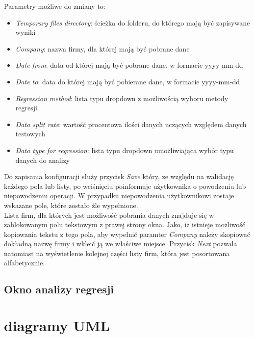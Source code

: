 Parametry możliwe do zmiany to:
\begin{itemize}
 \item \textit{Temporary files directory}: ścieżka do folderu, do którego mają być zapisywane wyniki
 \item \textit{Company}: nazwa firmy, dla której mają być pobrane dane
 \item \textit{Date from}: data od której mają być pobrane dane, w formacie yyyy-mm-dd
 \item \textit{Date to}: data do której mają być pobierane dane, w formacie yyyy-mm-dd
 \item \textit{Regression method}: lista typu dropdown z możliwością wyboru metody regresji
 \item \textit{Data split rate}: wartość procentowa ilości danych uczących względem danych testowych
 \item \textit{Data type for regression}: lista typu dropdown umożliwiająca wybór typu danych do analizy
\end{itemize}

Do zapisania konfiguracji służy przycisk \textit{Save} który, ze względu na walidację każdego pola lub listy, po wciśnięciu poinformuje użytkownika o powodzeniu lub niepowodzeniu operacji.
W przypadku niepowodzenia użytkownikowi zostaje wskazane pole, które zostało źle wypełnione.\\

Lista firm, dla których jest możliwość pobrania danych znajduje się w zablokowanym polu tekstowym z prawej strony okna.
Jako, iż istnieje możliwość kopiowania tekstu z tego pola, aby wypełnić paramter \textit{Company} należy skopiować dokładną nazwę firmy i wkleić ją we właściwe miejsce.
Przycisk \textit{Next} pozwala natomiast na wyświetlenie kolejnej części listy firm, która jest posortowana alfabetycznie.


\subsection{Okno analizy regresji}

\section{diagramy UML}